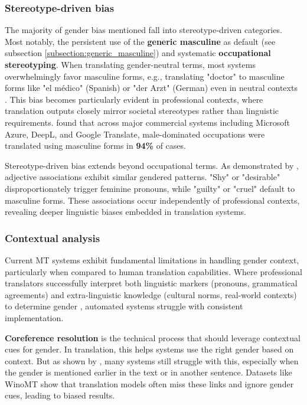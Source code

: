 \subsubsection{Stereotype-driven bias}

The majority of gender bias mentioned fall into stereotype-driven categories. Most notably, the persistent use of the \textbf{generic masculine} as default (see subsection \ref{subsection:generic_masculine}) and systematic \textbf{occupational stereotyping}. When translating gender-neutral terms, most systems overwhelmingly favor masculine forms, e.g., translating "doctor" to masculine forms like "el médico" (Spanish) or "der Arzt" (German) even in neutral contexts \citep{smacchiaDoesAIReflect2024,choMeasuringGenderBias2019,pratesAssessingGenderBias2019}. This bias becomes particularly evident in professional contexts, where translation outputs closely mirror societal stereotypes rather than linguistic requirements. \citet{smacchiaDoesAIReflect2024} found that across major commercial systems including Microsoft Azure, DeepL, and Google Translate, male-dominated occupations were translated using masculine forms in \textbf{94\%} of cases.

Stereotype-driven bias extends beyond occupational terms. As demonstrated by \citet{pratesAssessingGenderBias2019}, adjective associations exhibit similar gendered patterns. "Shy" or "desirable" disproportionately trigger feminine pronouns, while "guilty" or "cruel" default to masculine forms. These associations occur independently of professional contexts, revealing deeper linguistic biases embedded in translation systems.

\subsubsection{Contextual analysis} \label{subsection:contextual_analysis}

Current MT systems exhibit fundamental limitations in handling gender context, particularly when compared to human translation capabilities. Where professional translators successfully interpret both linguistic markers (pronouns, grammatical agreements) and extra-linguistic knowledge (cultural norms, real-world contexts) to determine gender \citep{rescignoGenderBiasMachine2023}, automated systems struggle with consistent implementation.

\textbf{Coreference resolution} is the technical process that should leverage contextual cues for gender. In translation, this helps systems use the right gender based on context. But as shown by \citet{choMeasuringGenderBias2019}, many systems still struggle with this, especially when the gender is mentioned earlier in the text or in another sentence. Datasets like WinoMT \citep{stanovskyEvaluatingGenderBias2019} show that translation models often miss these links and ignore gender cues, leading to biased results.

